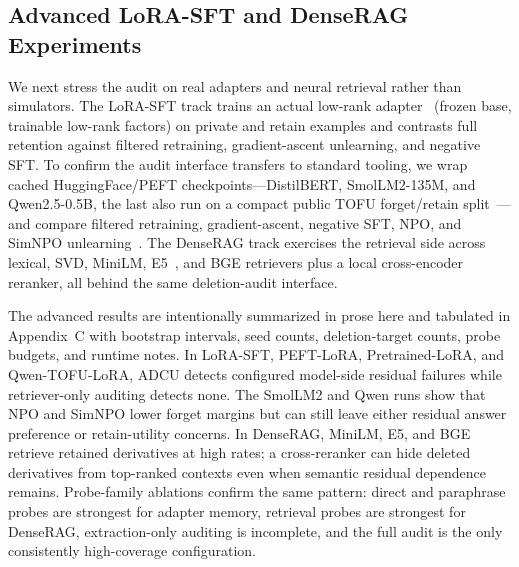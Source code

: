 \documentclass[10pt,journal,compsoc]{IEEEtran}
\newcommand{\method}{ADCU}
\begin{document}
\subsection{Advanced LoRA-SFT and DenseRAG Experiments}

We next stress the audit on real adapters and neural retrieval rather than simulators. The LoRA-SFT track trains an actual low-rank adapter~\cite{hu2021lora} (frozen base, trainable low-rank factors) on private and retain examples and contrasts full retention against filtered retraining, gradient-ascent unlearning, and negative SFT. To confirm the audit interface transfers to standard tooling, we wrap cached HuggingFace/PEFT checkpoints---DistilBERT, SmolLM2-135M, and Qwen2.5-0.5B, the last also run on a compact public TOFU forget/retain split~\cite{maini2024tofu}---and compare filtered retraining, gradient-ascent, negative SFT, NPO, and SimNPO unlearning~\cite{zhang2024npo}. The DenseRAG track exercises the retrieval side across lexical, SVD, MiniLM, E5~\cite{wang2022textembeddings}, and BGE retrievers plus a local cross-encoder reranker, all behind the same deletion-audit interface.

The advanced results are intentionally summarized in prose here and tabulated in Appendix~C with bootstrap intervals, seed counts, deletion-target counts, probe budgets, and runtime notes. In LoRA-SFT, PEFT-LoRA, Pretrained-LoRA, and Qwen-TOFU-LoRA, \method{} detects configured model-side residual failures while retriever-only auditing detects none. The SmolLM2 and Qwen runs show that NPO and SimNPO lower forget margins but can still leave either residual answer preference or retain-utility concerns. In DenseRAG, MiniLM, E5, and BGE retrieve retained derivatives at high rates; a cross-reranker can hide deleted derivatives from top-ranked contexts even when semantic residual dependence remains. Probe-family ablations confirm the same pattern: direct and paraphrase probes are strongest for adapter memory, retrieval probes are strongest for DenseRAG, extraction-only auditing is incomplete, and the full audit is the only consistently high-coverage configuration.
\end{document}
